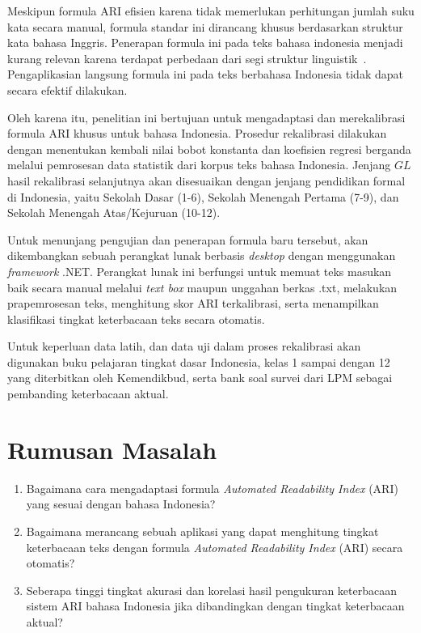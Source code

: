 Meskipun formula ARI efisien karena tidak memerlukan perhitungan jumlah suku kata secara manual, formula standar ini dirancang khusus berdasarkan struktur kata bahasa Inggris. Penerapan formula ini pada teks bahasa indonesia menjadi kurang relevan karena terdapat perbedaan dari segi struktur linguistik~\cite{mangilaleng2025modification}. Pengaplikasian langsung formula ini pada teks berbahasa Indonesia tidak dapat secara efektif dilakukan. 

Oleh karena itu, penelitian ini bertujuan untuk mengadaptasi dan merekalibrasi formula ARI khusus untuk bahasa Indonesia. Prosedur rekalibrasi dilakukan dengan menentukan kembali nilai bobot konstanta dan koefisien regresi berganda melalui pemrosesan data statistik dari korpus teks bahasa Indonesia. Jenjang $GL$ hasil rekalibrasi selanjutnya akan disesuaikan dengan jenjang pendidikan formal di Indonesia, yaitu Sekolah Dasar (1-6), Sekolah Menengah Pertama (7-9), dan Sekolah Menengah Atas/Kejuruan (10-12).

Untuk menunjang pengujian dan penerapan formula baru tersebut, akan dikembangkan sebuah perangkat lunak berbasis \textit{desktop} dengan menggunakan \textit{framework} .NET. Perangkat lunak ini berfungsi untuk memuat teks masukan baik secara manual melalui \textit{text box} maupun unggahan berkas .txt, melakukan prapemrosesan teks, menghitung skor ARI terkalibrasi, serta menampilkan klasifikasi tingkat keterbacaan teks secara otomatis.

Untuk keperluan data latih, dan data uji dalam proses rekalibrasi akan digunakan buku pelajaran tingkat dasar Indonesia, kelas 1 sampai dengan 12 yang diterbitkan oleh Kemendikbud, serta bank soal survei dari LPM sebagai pembanding keterbacaan aktual.


\section{Rumusan Masalah}
\label{sec:rumusan}
\begin{enumerate}
    \item Bagaimana cara mengadaptasi formula \textit{Automated Readability Index} (ARI) yang sesuai dengan bahasa Indonesia?
    \item Bagaimana merancang sebuah aplikasi yang dapat menghitung tingkat keterbacaan teks dengan formula \textit{Automated Readability Index} (ARI) secara otomatis?
    \item Seberapa tinggi tingkat akurasi dan korelasi hasil pengukuran keterbacaan sistem ARI bahasa Indonesia jika dibandingkan dengan tingkat keterbacaan aktual?
\end{enumerate}


